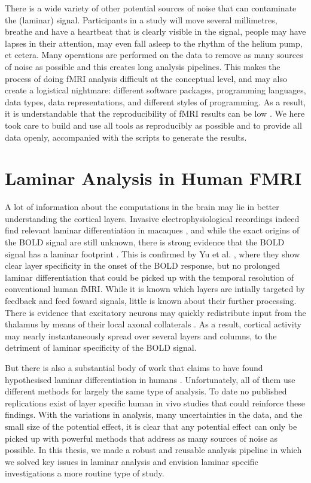 There is a wide variety of other potential sources of noise that can contaminate the (laminar) signal. Participants in a study will move several millimetres, breathe and have a heartbeat that is clearly visible in the signal, people may have lapses in their attention, may even fall asleep to the rhythm of the helium pump, et cetera. Many operations are performed on the data to remove as many sources of noise as possible and this creates long analysis pipelines. This makes the process of doing fMRI analysis difficult at the conceptual level, and may also create a logistical nightmare: different software packages, programming languages, data types, data representations, and different styles of programming. As a result, it is understandable that the reproducibility of fMRI results can be low \cite{Nosek2015,Gorgolewski2016a}. We here took care to build and use all tools as reproducibly as possible and to provide all data openly, accompanied with the scripts to generate the results.

\section{Laminar Analysis in Human FMRI}
A lot of information about the computations in the brain may lie in better understanding the cortical layers. Invasive electrophysiological recordings indeed find relevant laminar differentiation in macaques \cite{Buffalo2011,Maier2010,Maier2011,VanKerkoerle2017}, and while the exact origins of the BOLD signal are still unknown, there is strong evidence that the BOLD signal has a laminar footprint \cite{Goense2006}. This is confirmed by Yu et al. \cite{Yu2014}, where they show clear layer specificity in the onset of the BOLD response, but no prolonged laminar differentiation that could be picked up with the temporal resolution of conventional human fMRI. While it is known which layers are intially targeted by feedback and feed foward signals, little is known about their further processing. There is evidence that excitatory neurons may quickly redistribute input from the thalamus by means of their local axonal collaterals \cite{Guy2017,ReyesPuerta2015}. As a result, cortical activity may nearly instantaneously spread over several layers and columns, to the detriment of laminar specificity of the BOLD signal.

But there is also a substantial body of work that claims to have found hypothesised laminar differentiation in humans \cite{Maass2014,Muckli2015,Kok2016,Huber2017}. Unfortunately, all of them use different methods for largely the same type of analysis. To date no published replications exist of layer specific human in vivo studies that could reinforce these findings. With the variations in analysis, many uncertainties in the data, and the small size of the potential effect, it is clear that any potential effect can only be picked up with powerful methods that address as many sources of noise as possible. In this thesis, we made a robust and reusable analysis pipeline in which we solved key issues in laminar analysis and envision laminar specific investigations a more routine type of study.





